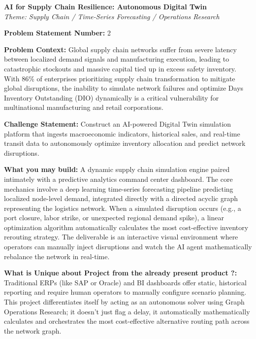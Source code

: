 \documentclass[11pt, a4paper]{article}
\begin{document}
\begin{center}
    \Large\textbf{AI for Supply Chain Resilience: Autonomous Digital Twin} \\
    \normalsize\textit{Theme: Supply Chain / Time-Series Forecasting / Operations Research}
\end{center}
\vspace{0.8cm}

\noindent\textbf{Problem Statement Number:} 2

\vspace{0.4cm}
\noindent\textbf{Problem Context:} Global supply chain networks suffer from severe latency between localized demand signals and manufacturing execution, leading to catastrophic stockouts and massive capital tied up in excess safety inventory. With 86\% of enterprises prioritizing supply chain transformation to mitigate global disruptions, the inability to simulate network failures and optimize Days Inventory Outstanding (DIO) dynamically is a critical vulnerability for multinational manufacturing and retail corporations.

\vspace{0.4cm}
\noindent\textbf{Challenge Statement:} Construct an AI-powered Digital Twin simulation platform that ingests macroeconomic indicators, historical sales, and real-time transit data to autonomously optimize inventory allocation and predict network disruptions.

\vspace{0.4cm}
\noindent\textbf{What you may build:} A dynamic supply chain simulation engine paired intimately with a predictive analytics command center dashboard. The core mechanics involve a deep learning time-series forecasting pipeline predicting localized node-level demand, integrated directly with a directed acyclic graph representing the logistics network. When a simulated disruption occurs (e.g., a port closure, labor strike, or unexpected regional demand spike), a linear optimization algorithm automatically calculates the most cost-effective inventory rerouting strategy. The deliverable is an interactive visual environment where operators can manually inject disruptions and watch the AI agent mathematically rebalance the network in real-time.

\vspace{0.4cm}
\noindent\textbf{What is Unique about Project from the already present product ?:} Traditional ERPs (like SAP or Oracle) and BI dashboards offer static, historical reporting and require human operators to manually configure scenario planning. This project differentiates itself by acting as an autonomous solver using Graph Operations Research; it doesn't just flag a delay, it automatically mathematically calculates and orchestrates the most cost-effective alternative routing path across the network graph.
\end{document}
